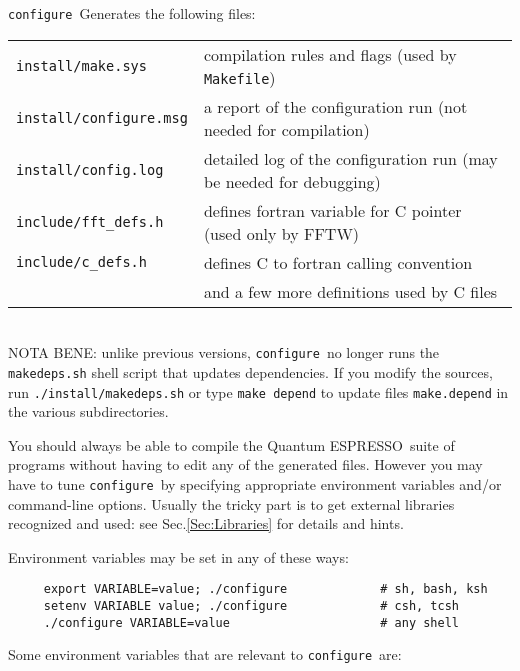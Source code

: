 \documentclass[12pt,a4paper]{article}
\def\qe{{\sc Quantum ESPRESSO}}
\def\configure{\texttt{configure}}
\begin{document}
\configure\ Generates the following files:

\begin{tabular}{ll}
\texttt{install/make.sys} &      compilation rules and flags (used by \texttt{Makefile})\\
\texttt{install/configure.msg} & a report of the configuration run (not needed for compilation)\\
\texttt{install/config.log} & detailed log of the configuration run (may be needed for debugging)\\
\texttt{include/fft\_defs.h} &    defines fortran variable for C pointer (used only by FFTW)\\
\texttt{include/c\_defs.h} &      defines C to fortran calling convention\\
                           & and a few more definitions used by C files\\
\end{tabular}\\
NOTA BENE: unlike previous versions, \configure\ no longer runs the 
\texttt{makedeps.sh} shell script that updates dependencies. If you modify the  
sources, run \texttt{./install/makedeps.sh} or type \texttt{make depend}
to update files \texttt{make.depend} in the various subdirectories.
    
You should always be able to compile the \qe\ suite
of programs without having to edit any of the generated files. However you
may have to tune \configure\ by specifying appropriate environment variables
and/or command-line options. Usually the tricky part is to get external
libraries recognized and used: see Sec.\ref{Sec:Libraries}
for details and hints.

Environment variables may be set in any of these ways:
\begin{verbatim}
     export VARIABLE=value; ./configure             # sh, bash, ksh
     setenv VARIABLE value; ./configure             # csh, tcsh
     ./configure VARIABLE=value                     # any shell
\end{verbatim}
Some environment variables that are relevant to \configure\ are:
\end{document}
